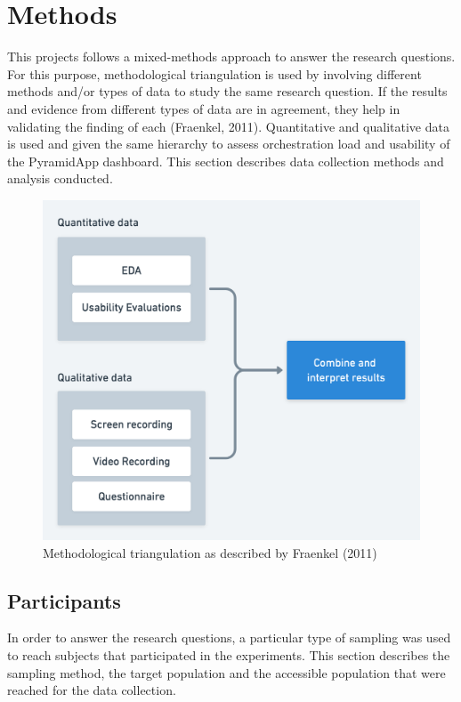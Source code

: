 \normallinespacing

\chapter{Methods}
This projects follows a mixed-methods approach to answer the research questions. For this purpose, methodological triangulation is used by involving different methods and/or types of data to study the same research question. If the results and evidence from different types of data are in agreement, they help in validating the finding of each (Fraenkel, 2011). Quantitative and qualitative data is used and given the same hierarchy to assess orchestration load and usability of the PyramidApp dashboard. This section describes data collection methods and analysis conducted.
\begin{figure}[!h]
    \includegraphics[clip,width=\columnwidth]{Figures/triangulation.png}%
\caption{Methodological triangulation as described by Fraenkel (2011)}
\label{fig:triangulation}
\end{figure}
\section{Participants}
In order to answer the research questions, a particular type of sampling was used to reach subjects that participated in the experiments. This section describes the sampling method, the target population and the accessible population that were reached for the data collection.
